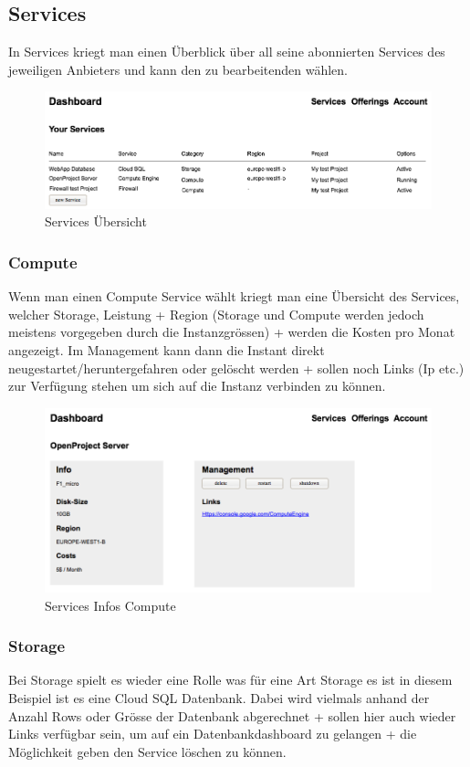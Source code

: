 \subsection{Services}
In Services kriegt man einen Überblick über all seine abonnierten Services des jeweiligen 
Anbieters und kann den zu bearbeitenden wählen.
\begin{figure}[!htbp]
\includegraphics[width=\textwidth]{./03_Analyse/03_Dashboard/images/services_overview}
\caption{Services Übersicht}
\end{figure}

\subsubsection{Compute}
Wenn man einen Compute Service wählt kriegt man eine Übersicht des Services, 
welcher Storage, Leistung + Region (Storage und Compute werden jedoch 
meistens vorgegeben durch die Instanzgrössen) + werden die Kosten pro 
Monat angezeigt.
Im Management kann dann die Instant direkt neugestartet/heruntergefahren oder gelöscht 
werden + sollen noch Links (Ip etc.) zur Verfügung stehen um sich auf die Instanz 
 verbinden zu können.
 
\begin{figure}[!htbp]
\includegraphics[width=\textwidth]{./03_Analyse/03_Dashboard/images/service_info_compute}
\caption{Services Infos Compute}
\end{figure}

\subsubsection{Storage}
Bei Storage spielt es wieder eine Rolle was für eine Art Storage es ist in 
diesem Beispiel ist es eine Cloud SQL Datenbank.
Dabei wird vielmals anhand der Anzahl Rows oder Grösse der Datenbank abgerechnet 
+ sollen hier auch wieder Links verfügbar sein, um auf ein Datenbankdashboard zu 
gelangen + die Möglichkeit geben den Service löschen zu können.

